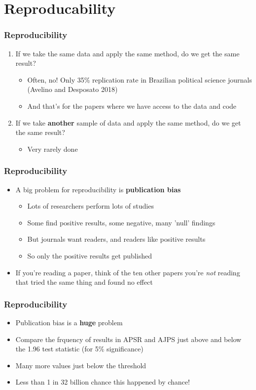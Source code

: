 \documentclass[xcolor=x11names,compress]{beamer}\usepackage[]{graphicx}\usepackage[]{color}
\renewcommand{\(}{\begin{columns}}
\renewcommand{\)}{\end{columns}}
\newcommand{\<}[1]{\begin{column}{#1}}
\renewcommand{\>}{\end{column}}
\begin{document}
\section{Reproducability}


\begin{frame}
\frametitle{Reproducibility}
\begin{enumerate}
\item If we take the same data and apply the same method, do we get the same result?
\pause
\begin{itemize}
\item Often, no! Only 35\% replication rate in Brazilian political science journals (Avelino and Desposato 2018)
\pause
\item And that's for the papers where we have access to the data and code
\pause
\end{itemize}
\item If we take \textbf{another} sample of data and apply the same method, do we get the same result?
\begin{itemize}
\item Very rarely done
\end{itemize}
\end{enumerate}
\end{frame}

\begin{frame}
\frametitle{Reproducibility}
\begin{itemize}
\item A big problem for reproducibility is \textbf{publication bias}
\pause
\begin{itemize}
\item Lots of researchers perform lots of studies
\pause
\item Some find positive results, some negative, many 'null' findings
\pause
\item But journals want readers, and readers like positive results
\pause
\item So only the positive results get published
\pause
\end{itemize}
\item If you're reading a paper, think of the ten other papers you're \textit{not} reading that tried the same thing and found no effect
\end{itemize}
\end{frame}

\begin{frame}
\frametitle{Reproducibility}
\begin{itemize}
\item Publication bias is a \textbf{huge} problem
\pause
\item Compare the frquency of results in APSR and AJPS just above and below the 1.96 test statistic (for 5\% significance)
\pause
\item Many more values just below the threshold
\pause
\item Less than 1 in 32 billion chance this happened by chance!
\end{itemize}
\end{frame}
\end{document}
